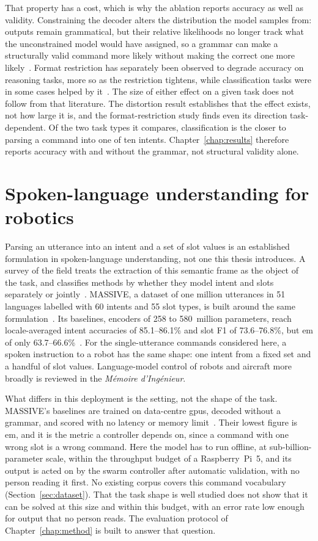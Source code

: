 That property has a cost, which is why the ablation reports accuracy as well as validity.
Constraining the decoder alters the distribution the model samples from: outputs remain
grammatical, but their relative likelihoods no longer track what the unconstrained model would
have assigned, so a grammar can make a structurally valid command more likely without making the
correct one more likely~\cite{park2024}. Format restriction has separately been observed to
degrade accuracy on reasoning tasks, more so as the restriction tightens, while classification
tasks were in some cases helped by it~\cite{tam2024}. The size of either effect on a given task
does not follow from that literature. The distortion result establishes that the effect exists,
not how large it is, and the format-restriction study finds even its direction task-dependent.
Of the two task types it compares, classification is the closer to parsing a command into one of
ten intents. Chapter~\ref{chap:results} therefore reports accuracy with and without the grammar,
not structural validity alone.

\section{Spoken-language understanding for robotics}
\label{sec:slu-robotics}
Parsing an utterance into an intent and a set of slot values is an established formulation in
spoken-language understanding, not one this thesis introduces. A survey of the field treats the
extraction of this semantic frame as the object of the task, and classifies methods by whether they
model intent and slots separately or jointly~\cite{qin2021}. MASSIVE, a dataset of one million
utterances in 51 languages labelled with 60 intents and 55 slot types, is built around the same
formulation~\cite{massive}. Its baselines, encoders of 258 to 580~million parameters, reach
locale-averaged intent accuracies of 85.1--86.1\% and slot F1 of 73.6--76.8\%, but \gls{em}
of only 63.7--66.6\%~\cite{massive}. For the single-utterance commands considered here, a spoken
instruction to a robot has the same shape: one intent from a fixed set and a handful of slot
values. Language-model control of robots and aircraft more broadly is reviewed in the
\emph{M\'emoire d'Ing\'enieur}.

What differs in this deployment is the setting, not the shape of the task. MASSIVE's baselines are
trained on data-centre \glspl{gpu}, decoded without a grammar, and scored with no latency or
memory limit~\cite{massive}. Their lowest figure is \gls{em}, and it is the metric a controller
depends on, since a command with one wrong slot is a wrong command. Here the model has to
run offline, at sub-billion-parameter scale, within the throughput budget of a Raspberry~Pi~5, and
its output is acted on by the swarm controller after automatic validation, with no person reading
it first. No existing corpus covers this command vocabulary (Section~\ref{sec:dataset}). That the
task shape is well studied does not show that it can be solved at this size and within this
budget, with an error rate low enough for output that no person reads. The evaluation protocol of
Chapter~\ref{chap:method} is built to answer that question.

